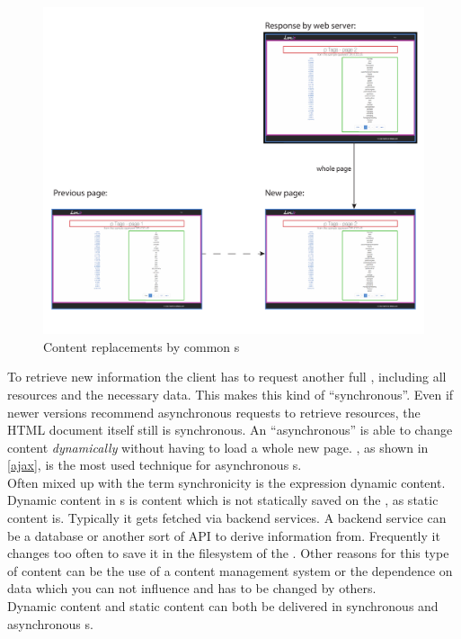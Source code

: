 \begin{figure}[H]
\centering
\includegraphics[width=12cm]{images/http_replacements.pdf}
\caption[ajax_replacements]{Content replacements by common \httpRequest{}s}
\label{fig:ajax_replacements}
\end{figure}

\noindent{}To retrieve new information the client has to request another full \webPage{}, including all resources and the necessary data.
This makes this kind of \webSite{} \enquote{synchronous}.
Even if newer \http{} versions recommend asynchronous requests to retrieve resources, the HTML document itself still is synchronous. 
An \enquote{asynchronous} \webSite{} is able to change content \emph{dynamically} without having to load a whole new page.
\ajax{}, as shown in \ref{ajax}, is the most used technique for asynchronous \webSite{}s.
\\
Often mixed up with the term synchronicity is the expression dynamic content.
Dynamic content in \webSite{}s is content which is not statically saved on the \webServer{}, as static content is.
Typically it gets fetched via backend services.
A backend service can be a database or another sort of API to derive information from.
Frequently it changes too often to save it in the filesystem of the \webServer{}.
Other reasons for this type of content can be the use of a content management system or the dependence on data which you can not influence and has to be changed by others.
\\
Dynamic content and static content can both be delivered in synchronous and asynchronous \webApplication{}s.



